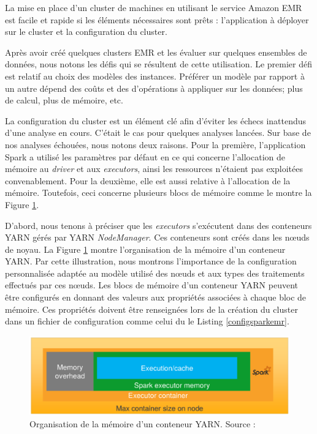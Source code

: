 La mise en place d'un cluster de machines en utilisant le service Amazon EMR est facile et rapide si les éléments nécessaires sont prêts : l'application à déployer sur le cluster et la configuration du cluster.

Après avoir créé quelques clusters EMR et les évaluer sur quelques ensembles de données, nous notons les défis qui se résultent de cette utilisation. 
Le premier défi est relatif au  choix des modèles des instances. Préférer un modèle par rapport à un autre dépend des coûts et   des d'opérations à appliquer sur les données; plus de calcul, plus de mémoire, etc.

La configuration du cluster est un élément clé afin d'éviter les échecs inattendus d'une analyse en cours. C'était le cas pour  quelques analyses lancées. Sur base de nos  analyses échouées, nous notons deux  raisons. Pour la première,  l'application Spark a  utilisé les paramètres par défaut en ce qui concerne l'allocation de mémoire au  \textit{driver} et aux \textit{executors}, ainsi les ressources n'étaient pas exploitées convenablement.  Pour la deuxième, elle est aussi relative  à l'allocation de la mémoire. Toutefois, ceci concerne plusieurs blocs de mémoire comme le montre la Figure 	\ref{fig:spark-executoronyarn}.


D'abord, nous tenons à préciser que les \textit{executors} s'exécutent dans des conteneurs YARN gérés par YARN \textit{NodeManager}. Ces conteneurs sont créés dans les n\oe{}uds de noyau. La Figure 	\ref{fig:spark-executoronyarn} montre l'organisation de la mémoire d'un conteneur YARN. Par cette illustration, nous montrons l'importance de la configuration personnalisée adaptée au modèle utilisé  des n\oe{}uds et aux types des traitements effectués par ces n\oe{}uds. 
Les blocs de mémoire d'un conteneur YARN   peuvent être configurés en donnant des valeurs aux propriétés associées à chaque bloc de mémoire. Ces propriétés doivent être renseignées lors de la création du cluster  dans un fichier de configuration  comme celui du le Listing \ref{configsparkemr}.

\begin{figure}[h]
	\centering
	\includegraphics[width=\linewidth]{illustrations/spark-executoronyarn}
	\caption{Organisation de la mémoire d'un conteneur YARN. Source :  \cite{best-practices-emr}}
	\label{fig:spark-executoronyarn}
\end{figure}


